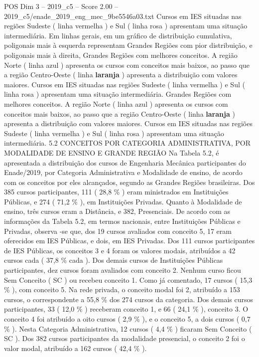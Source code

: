 \begin{textsample}{POS Dim 3 – 2019\_c5 – Score 2.00 – 2019\_c5/enade\_2019\_eng\_mec\_9be5546a03.txt}
Cursos em IES situadas nas regiões Sudeste ( linha vermelha ) e Sul ( linha rosa ) apresentam uma situação intermediária.
Em linhas gerais, em um gráfico de distribuição cumulativa, poligonais mais à esquerda representam Grandes Regiões com pior distribuição, e poligonais mais à direita, Grandes Regiões com melhores conceitos.
A região Norte ( linha azul ) apresenta os cursos com conceitos mais baixos, ao passo que a região Centro-Oeste ( linha \textbf{laranja} ) apresenta a distribuição com valores maiores.
Cursos em IES situadas nas regiões Sudeste ( linha vermelha ) e Sul ( linha rosa ) apresentam uma situação intermediária.
Grandes Regiões com melhores conceitos.
A região Norte ( linha azul ) apresenta os cursos com conceitos mais baixos, ao passo que a região Centro-Oeste ( linha \textbf{laranja} ) apresenta a distribuição com valores maiores.
Cursos em IES situadas nas regiões Sudeste ( linha vermelha ) e Sul ( linha rosa ) apresentam uma situação intermediária. 5.2 CONCEITOS POR CATEGORIA ADMINISTRATIVA, POR MODALIDADE DE ENSINO E GRANDE REGIÃO Na Tabela 5.2, é apresentada a distribuição dos cursos de Engenharia Mecânica participantes do Enade/2019, por Categoria Administrativa e Modalidade de ensino, de acordo com os conceitos por eles alcançados, segundo as Grandes Regiões brasileiras.
Dos 385 cursos participantes, 111 ( 28,8 \% ) eram ministrados em Instituições Públicas, e 274 ( 71,2 \% ), em Instituições Privadas.
Quanto à Modalidade de ensino, três cursos eram a Distância, e 382, Presenciais.
De acordo com as informações da Tabela 5.2, em termos nacionais, entre Instituições Públicas e Privadas, observa -se que, dos 19 cursos avaliados com conceito 5, 17 eram oferecidos em IES Públicas, e dois, em IES Privadas.
Dos 111 cursos participantes de IES Públicas, os conceitos 3 e 4 foram os valores modais, atribuídos a 42 cursos cada ( 37,8 \% cada ).
Dos demais cursos de Instituições Públicas participantes, dez cursos foram avaliados com conceito 2.
Nenhum curso ficou Sem Conceito ( SC ) ou recebeu conceito 1.
Como já comentado, 17 cursos ( 15,3 \% ), com conceito 5.
Na rede privada, o conceito modal foi 2, atribuído a 153 cursos, o correspondente a 55,8 \% dos 274 cursos da categoria.
Dos demais cursos participantes, 33 ( 12,0 \% ) receberam conceito 1, e 66 ( 24,1 \% ), conceito 3.
O conceito 4 foi atribuído a oito cursos ( 2,9 \% ), e o conceito 5, a dois cursos ( 0,7 \% ).
Nesta Categoria Administrativa, 12 cursos ( 4,4 \% ) ficaram Sem Conceito ( SC ).
Dos 382 cursos participantes da modalidade presencial, o conceito 2 foi o valor modal, atribuído a 162 cursos ( 42,4 \% ).

\end{textsample}
